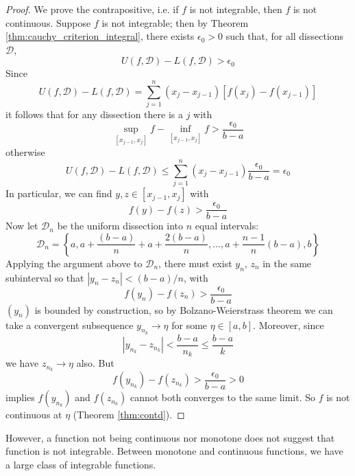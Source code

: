 \documentclass[10pt, a4paper, twoside]{report}
\begin{document}
\begin{proof}
    We prove the contrapositive, i.e. if \(f\) is not integrable, then \(f\) is not continuous. Suppose \(f\) is not integrable; then by Theorem \ref{thm:cauchy_criterion_integral}, there exists \(\epsilon_0>0\) such that, for all dissections \(\mathcal{D}\),
    \[U(f,\mathcal{D})-L(f,\mathcal{D})>\epsilon_0\]
    Since
    \[U(f,\mathcal{D})-L(f,\mathcal{D})=\sum_{j=1}^{n}(x_j-x_{j-1})[f(x_j)-f(x_{j-1})]\]
    it follows that for any dissection there is a \(j\) with 
    \[\sup_{[x_{j-1},x_j]}f-\inf_{[x_{j-1},x_j]}f>\frac{\epsilon_0}{b-a}\]
    otherwise
    \[U(f,\mathcal{D})-L(f,\mathcal{D})\leq\sum_{j=1}^{n}(x_j-x_{j-1})\frac{\epsilon_0}{b-a}=\epsilon_0\]
    In particular, we can find \(y,z\in[x_{j-1},x_j]\) with 
    \[f(y)-f(z)>\frac{\epsilon_0}{b-a}\]
    Now let \(\mathcal{D}_n\) be the uniform dissection into \(n\) equal intervals:
    \[\mathcal{D}_n=\left\{a,a+\frac{(b-a)}{n}+a+\frac{2(b-a)}{n},\ldots,a+\frac{n-1}{n}(b-a),b\right\}\]
    Applying the argument above to \(\mathcal{D}_n\), there must exist \(y_n\), \(z_n\) in the same subinterval so that \(|y_n-z_n|<(b-a)/n\), with 
    \[f(y_n)-f(z_n)>\frac{\epsilon_0}{b-a}\]
    \((y_n)\) is bounded by construction, so by Bolzano-Weierstrass theorem we can take a convergent subsequence \(y_{n_k}\to\eta\) for some \(\eta\in[a,b]\). Moreover, since
    \[|y_{n_k}-z_{n_k}|<\frac{b-a}{n_k}\leq\frac{b-a}{k}\]
    we have \(z_{n_k}\to\eta\) also. But 
    \[f(y_{n_k})-f(z_{n_k})>\frac{\epsilon_0}{b-a}>0\]
    implies \(f(y_{n_k})\) and \(f(z_{n_k})\) cannot both converges to the same limit. So \(f\) is not continuous at \(\eta\) (Theorem \ref{thm:contd}).
\end{proof}
However, a function not being continuous nor monotone does not suggest that function is not integrable. Between monotone and continuous functions, we have a large class of integrable functions.
\end{document}

